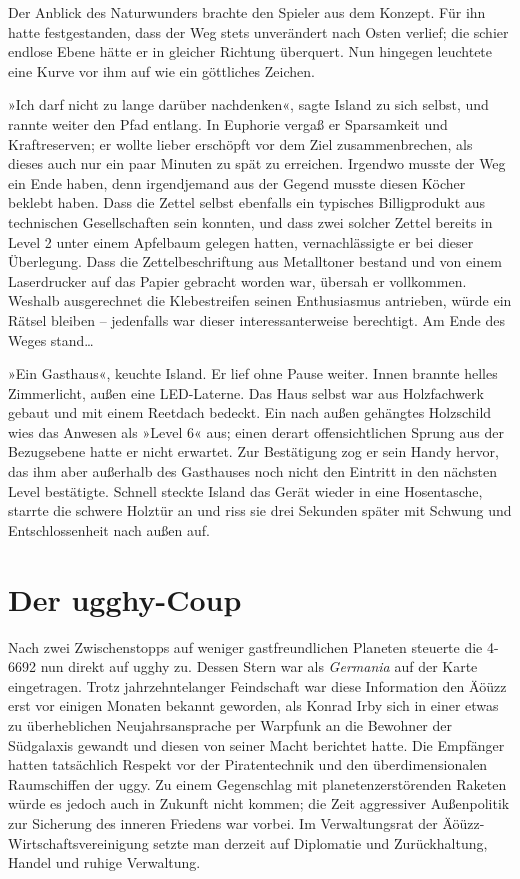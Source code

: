 Der Anblick des Naturwunders brachte den Spieler aus dem Konzept. Für ihn hatte festgestanden, dass der Weg stets unverändert nach Osten verlief; die schier endlose Ebene hätte er in gleicher Richtung überquert. Nun hingegen leuchtete eine Kurve vor ihm auf wie ein göttliches Zeichen.

»Ich darf nicht zu lange darüber nachdenken«, sagte Island zu sich selbst, und rannte weiter den Pfad entlang. In Euphorie vergaß er Sparsamkeit und Kraftreserven; er wollte lieber erschöpft vor dem Ziel zusammenbrechen, als dieses auch nur ein paar Minuten zu spät zu erreichen. Irgendwo musste der Weg ein Ende haben, denn irgendjemand aus der Gegend musste diesen Köcher beklebt haben. Dass die Zettel selbst ebenfalls ein typisches Billigprodukt aus technischen Gesellschaften sein konnten, und dass zwei solcher Zettel bereits in Level 2 unter einem Apfelbaum gelegen hatten, vernachlässigte er bei dieser Überlegung. Dass die Zettelbeschriftung aus Metalltoner bestand und von einem Laserdrucker auf das Papier gebracht worden war, übersah er vollkommen. Weshalb ausgerechnet die Klebestreifen seinen Enthusiasmus antrieben, würde ein Rätsel bleiben – jedenfalls war dieser interessanterweise berechtigt. Am Ende des Weges stand…

»Ein Gasthaus«, keuchte Island. Er lief ohne Pause weiter. Innen brannte helles Zimmerlicht, außen eine LED-Laterne. Das Haus selbst war aus Holzfachwerk gebaut und mit einem Reetdach bedeckt. Ein nach außen gehängtes Holzschild wies das Anwesen als »Level 6« aus; einen derart offensichtlichen Sprung aus der Bezugsebene hatte er nicht erwartet. Zur Bestätigung zog er sein Handy hervor, das ihm aber außerhalb des Gasthauses noch nicht den Eintritt in den nächsten Level bestätigte. Schnell steckte Island das Gerät wieder in eine Hosentasche, starrte die schwere Holztür an und riss sie drei Sekunden später mit Schwung und Entschlossenheit nach außen auf.


\chapter{Der ugghy-Coup}

Nach zwei Zwischenstopps auf weniger gastfreundlichen Planeten steuerte die 4-6692 nun direkt auf ugghy zu. Dessen Stern war als \textit{Germania} auf der Karte eingetragen. Trotz jahrzehntelanger Feindschaft war diese Information den Äöüzz erst vor einigen Monaten bekannt geworden, als Konrad Irby sich in einer etwas zu überheblichen Neujahrsansprache per Warpfunk an die Bewohner der Südgalaxis gewandt und diesen von seiner Macht berichtet hatte. Die Empfänger hatten tatsächlich Respekt vor der Piratentechnik und den überdimensionalen Raumschiffen der uggy. Zu einem Gegenschlag mit planetenzerstörenden Raketen würde es jedoch auch in Zukunft nicht kommen; die Zeit aggressiver Außenpolitik zur Sicherung des inneren Friedens war vorbei. Im Verwaltungsrat der Äöüzz-Wirtschaftsvereinigung setzte man derzeit auf Diplomatie und Zurückhaltung, Handel und ruhige Verwaltung.

